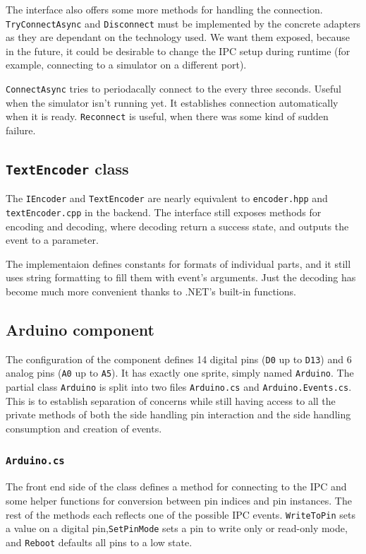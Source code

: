 The interface also offers some more methods for handling the connection. \texttt{TryConnectAsync} and \texttt{Disconnect} must be implemented by the concrete adapters as they are dependant on the technology used. We want them exposed, because in the future, it could be desirable to change the IPC setup during runtime (for example, connecting to a simulator on a different port).

\texttt{ConnectAsync} tries to periodacally connect to the every three seconds. Useful when the simulator isn't running yet. It establishes connection automatically when it is ready. \texttt{Reconnect} is useful, when there was some kind of sudden failure.

\subsection{\texttt{TextEncoder} class}

The \texttt{IEncoder} and \texttt{TextEncoder} are nearly equivalent to \texttt{encoder.hpp} and \texttt{textEncoder.cpp} in the backend. The interface still exposes methods for encoding and decoding, where decoding return a success state, and outputs the event to a parameter.

The implementaion defines constants for formats of individual parts, and it still uses string formatting to fill them with event's arguments. Just the decoding has become much more convenient thanks to .NET's built-in functions.

\subsection{Arduino component}

The configuration of the component defines 14 digital pins (\texttt{D0} up to \texttt{D13}) and 6 analog pins (\texttt{A0} up to \texttt{A5}). It has exactly one sprite, simply named \texttt{Arduino}. The partial class \texttt{Arduino} is split into two files \texttt{Arduino.cs} and \texttt{Arduino.Events.cs}. This is to establish separation of concerns while still having access to all the private methods of both the side handling pin interaction and the side handling consumption and creation of events.

\subsubsection{\texttt{Arduino.cs}}

The front end side of the class defines a method for connecting to the IPC and some helper functions for conversion between pin indices and pin instances. The rest of the methods each reflects one of the possible IPC events. \texttt{WriteToPin} sets a value on a digital pin,\texttt{SetPinMode} sets a pin to write only or read-only mode, and \texttt{Reboot} defaults all pins to a low state.

